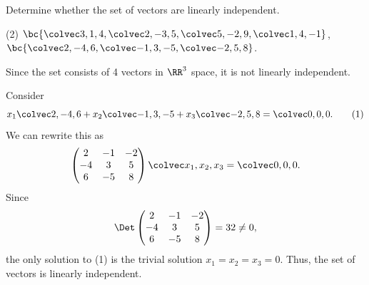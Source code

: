 \begin{problem}
    Determine whether the set of vectors are linearly independent.

    \begin{tasks}(2)
        \task $\bc{\cveciii314, \cveciii2{-3}5, \cveciii5{-2}{9}, \cveciii14{-1}}$,
        \task $\bc{\cveciii2{-4}6, \cveciii{-1}3{-5}, \cveciii{-2}58}$.
    \end{tasks}
\end{problem}
\begin{solution}
    \begin{ppart}
        Since the set consists of 4 vectors in $\RR^3$ space, it is not linearly independent.
    \end{ppart}
    \begin{ppart}
        Consider \[x_1 \cveciii2{-4}{6} + x_2 \cveciii{-1}{3}{-5} + x_3 \cveciii{-2}{5}8 = \cveciii000. \tag{1}\] We can rewrite this as \[\begin{pmatrix}2 & -1 & -2 \\ -4 & 3 & 5 \\ 6 & -5 & 8\end{pmatrix} \cveciii{x_1}{x_2}{x_3} = \cveciii000.\] Since \[\Det \begin{pmatrix}2 & -1 & -2 \\ -4 & 3 & 5 \\ 6 & -5 & 8\end{pmatrix} = 32 \neq 0,\] the only solution to (1) is the trivial solution $x_1 = x_2 = x_3 = 0$. Thus, the set of vectors is linearly independent.
    \end{ppart}
\end{solution}

